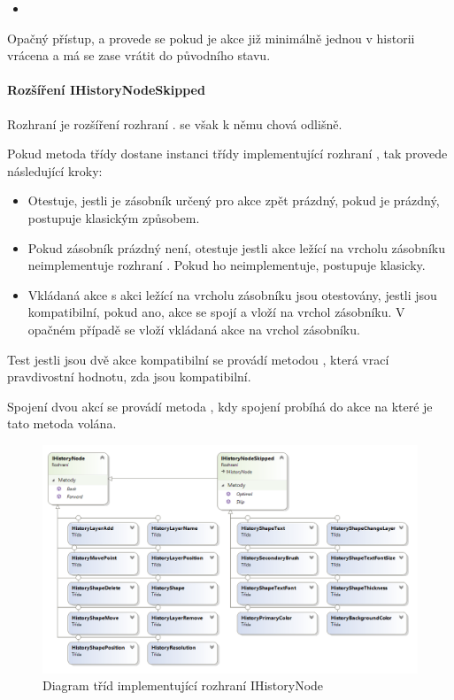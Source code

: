 \documentclass[
  field=inf,
  biblatex,
  glossaries,
  index
]{kidiplom}
\begin{document}
\begin{itemize}
\item {}
\end{itemize}
Opačný přístup, a provede se pokud je akce již minimálně jednou v historii vrácena a má se zase vrátit do původního stavu.

\paragraph{Rozšíření IHistoryNodeSkipped}
Rozhraní  je rozšíření rozhraní .  se však k němu chová odlišně.

Pokud metoda  třídy  dostane instanci třídy implementující rozhraní , tak provede následující kroky:

\begin{itemize}
\item Otestuje, jestli je zásobník určený pro akce zpět prázdný, pokud je prázdný, postupuje klasickým způsobem.
\item Pokud zásobník prázdný není, otestuje jestli akce ležící na vrcholu zásobníku neimplementuje rozhraní . Pokud ho neimplementuje, postupuje klasicky.
\item Vkládaná akce s akci ležící na vrcholu zásobníku jsou otestovány, jestli jsou kompatibilní, pokud ano, akce se spojí a vloží na vrchol zásobníku. V opačném případě se vloží vkládaná akce na vrchol zásobníku.
\end{itemize}

Test jestli jsou dvě akce  kompatibilní se provádí metodou , která vrací pravdivostní hodnotu, zda jsou kompatibilní.

Spojení dvou akcí se provádí metoda , kdy spojení probíhá do akce na které je tato metoda volána.


\begin{figure}
\includegraphics[width=15cm]{img/history_diag}
\caption{Diagram tříd implementující rozhraní IHistoryNode}
\end{figure}  
\end{document}

